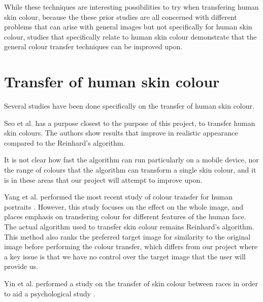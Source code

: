 While these techniques are interesting possibilities to try when transfering human skin colour, because the these prior studies are all concerned with different problems that can arise with general images but not specifically for human skin colour, studies that specifically relate to human skin colour demonstrate that the general colour transfer techniques can be improved upon.

\section{Transfer of human skin colour}
Several studies have been done specifically on the transfer of human skin colour.

Seo et al. \cite{seo_2005_transfer} has a purpose closest to the purpose of this project, to transfer human skin colours. The authors show results that improve in realistic appearance compared to the Reinhard's algorithm.


It is not clear how fast the algorithm can run particularly on a mobile device, nor the range of colours that the algorithm can transform a single skin colour, and it is in these areas that our project will attempt to improve upon.

Yang et al. performed the most recent study of colour transfer for human portraits \cite{yang_2015_semantic}. However, this study focuses on the effect on the whole image, and places emphasis on transfering colour for different features of the human face. The actual algorithm used to transfer skin colour remains Reinhard's algorithm. This method also ranks the preferred target image for similarity to the original image before performing the colour transfer, which differs from our project where a key issue is that we have no control over the target image that the user will provide us. 

Yin et al. performed a study on the transfer of skin colour between races in order to aid a psychological study \cite{yin_2004_transfer}. 


